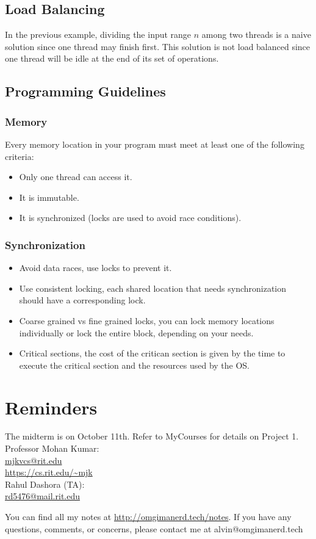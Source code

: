 \documentclass[letterpaper, 12pt]{math}
\begin{document}
\subsection*{Load Balancing}
In the previous example, dividing the input range \( n \) among two threads is
a naive solution since one thread may finish first. This solution is not load
balanced since one thread will be idle at the end of its set of operations.

\subsection*{Programming Guidelines}

\subsubsection*{Memory}
Every memory location in your program must meet at least one
of the following criteria:
\begin{itemize}
  \item Only one thread can access it.
  \item It is immutable.
  \item It is synchronized (locks are used to avoid race conditions).
\end{itemize}

\subsubsection*{Synchronization}
\begin{itemize}
  \item Avoid data races, use locks to prevent it.
  \item Use consistent locking, each shared location that needs synchronization
    should have a corresponding lock.
  \item Coarse grained vs fine grained locks, you can lock memory locations
    individually or lock the entire block, depending on your needs.
  \item Critical sections, the cost of the critican section is given by the
    time to execute the critical section and the resources used by the OS.
\end{itemize}

\section*{Reminders}
The midterm is on October 11th.
Refer to MyCourses for details on Project 1. \\

\noindent Professor Mohan Kumar: \\
\url{mjkvcs@rit.edu} \\
\url{https://cs.rit.edu/~mjk} \\

\noindent Rahul Dashora (TA): \\
\url{rd5476@mail.rit.edu} \\

\begin{center}
  You can find all my notes at \url{http://omgimanerd.tech/notes}. If you have
  any questions, comments, or concerns, please contact me at
  alvin@omgimanerd.tech
\end{center}
\end{document}
